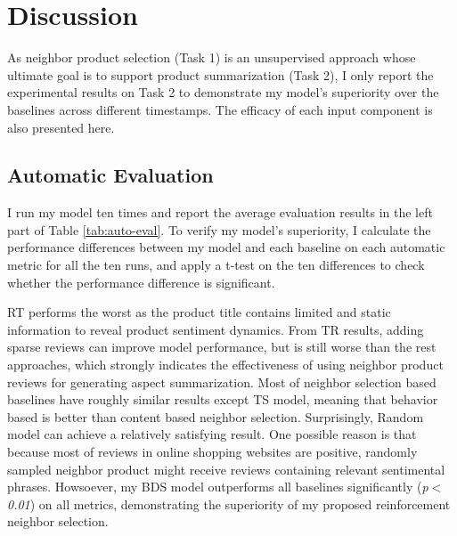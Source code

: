 \section{Discussion}
As neighbor product selection (Task 1) is an unsupervised approach whose ultimate goal is to support product summarization (Task 2),  I only report the experimental results on Task 2 to demonstrate my model's superiority over the baselines across different timestamps. The efficacy of each input component is also presented here.

\subsection{Automatic Evaluation}

I run my model ten times and report the average evaluation results in the left part of Table \ref{tab:auto-eval}. To verify my model's superiority, I calculate the performance differences between my model and each baseline on each automatic metric for all the ten runs, and apply a t-test on the ten differences to check whether the performance difference is significant. 

RT performs the worst as the product title contains limited and static information to reveal product sentiment dynamics. From TR results, adding sparse reviews can improve model performance, but is still worse than the rest approaches, which strongly indicates the effectiveness of using neighbor product reviews for generating aspect summarization. Most of neighbor selection based baselines have roughly similar results except TS model, meaning that behavior based is better than content based neighbor selection. Surprisingly, Random model can achieve a relatively satisfying result. One possible reason is that because most of reviews in online shopping websites are positive, randomly sampled neighbor product might receive reviews containing relevant sentimental phrases. Howsoever, my BDS model outperforms all baselines significantly (\textit{p$<$0.01}) on all metrics, demonstrating the superiority of my proposed reinforcement neighbor selection.
 

